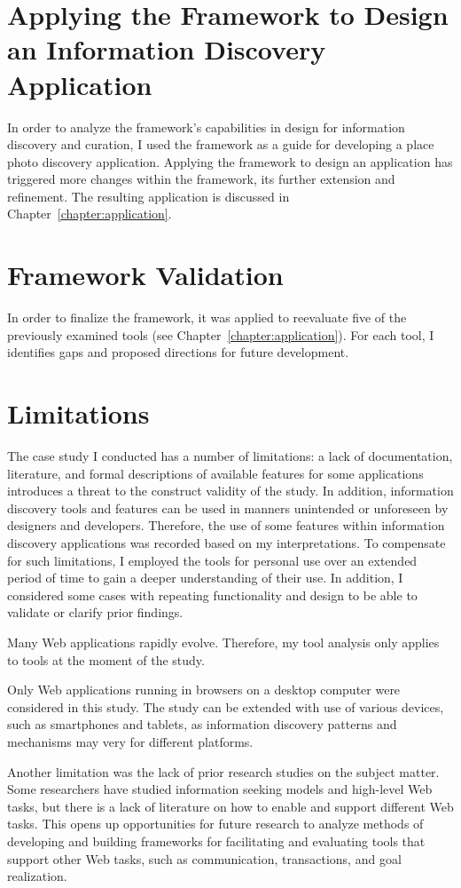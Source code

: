 {\section{Applying the Framework to Design\\ an Information Discovery Application}
In order to analyze the framework's capabilities in design for information discovery and curation, I used the framework as a guide for developing a place photo discovery application. Applying the framework to design an application has triggered more changes within the framework, its further extension and refinement. The resulting application is discussed in Chapter~\ref{chapter:application}.
}%

{\section{Framework Validation}
In order to finalize the framework, it was applied to reevaluate five of the previously examined tools (see Chapter~\ref{chapter:application}). For each tool, I identifies gaps and proposed directions for future development. 
}%

{\section{Limitations}
The case study I conducted has a number of limitations: a lack of documentation, literature, and formal descriptions of available features for some applications introduces a threat to the construct validity of the study. In addition, information discovery tools and features can be used in manners unintended or unforeseen by designers and developers. Therefore, the use of some features within information discovery applications was recorded based on my interpretations. To compensate for such limitations, I employed the tools for personal use over an extended period of time to gain a deeper understanding of their use. In addition, I considered some cases with repeating functionality and design to be able to validate or clarify prior findings. 

Many Web applications rapidly evolve. Therefore, my tool analysis only applies to tools at the moment of the study.

Only Web applications running in browsers on a desktop computer were considered in this study. The study can be extended with use of various devices, such as smartphones and tablets, as information discovery patterns and mechanisms may very for different platforms. 

Another limitation was the lack of prior research studies on the subject matter. Some researchers have studied information seeking models and high-level Web tasks, but there is a lack of literature on how to enable and support different Web tasks. This opens up opportunities for future research to analyze methods of developing and building frameworks for facilitating and evaluating tools that support other Web tasks, such as communication, transactions, and goal realization.


} %

